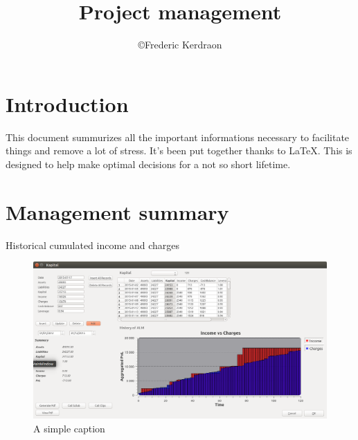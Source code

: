 \documentclass[8pt]{article} %
\title{Project management}
\author{\copyright Frederic Kerdraon}
\begin{document}
\maketitle
\tableofcontents

\section{Introduction}

This document summurizes all the important informations necessary to facilitate things and remove a lot of stress. It's been put together thanks to \LaTeX. This is designed to help make optimal decisions for a not so short lifetime.

%


\newcommand{\slice}[4]{
  \pgfmathparse{0.5*#1+0.5*#2}
  \let\midangle\pgfmathresult

   slice
  \draw[thick,fill=black!10] (0,0) -- (#1:1) arc (#1:#2:1) -- cycle;

   outer label
  \node[label=\midangle:#4] at (\midangle:1) {};

   inner label
  \pgfmathparse{min((#2-#1-10)/110*(-0.3),0)}
  \let\temp\pgfmathresult
  \pgfmathparse{max(\temp,-0.5) + 0.8}
  \let\innerpos\pgfmathresult
  \node at (\midangle:\innerpos) {#3};
}

\section{Management summary}

Historical cumulated income and charges

\begin{figure}[ht!]
\centering
\includegraphics[width=120mm]{Kapital2.png}
\caption{A simple caption \label{overflow}}
\end{figure}
\end{document}
